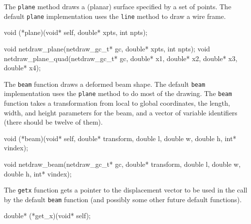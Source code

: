 The {\tt{}plane} method draws a (planar) surface specified by a set
of points.  The default {\tt{}plane} implementation uses the 
{\tt{}line} method to draw a wire frame.

\nwenddocs{}\plusendmoddef
void (*plane)(void* self, double* xpts, int npts);
\nwendcode{}\nwdocspar

\nwenddocs{}\plusendmoddef
void netdraw_plane(netdraw_gc_t* gc, double* xpts, int npts);
void netdraw_plane_quad(netdraw_gc_t* gc, 
                        double* x1, double* x2,
                        double* x3, double* x4);
\nwendcode{}\nwdocspar

The {\tt{}beam} function draws a deformed beam shape.  The default
{\tt{}beam} implementation uses the {\tt{}plane} method to do most
of the drawing. 
The {\tt{}beam} function takes a transformation from local to global coordinates,
the length, width, and height parameters for the beam, and a vector of
variable identifiers (there should be twelve of them).

\nwenddocs{}\plusendmoddef
void (*beam)(void* self, double* transform, 
             double l, double w, double h, 
             int* vindex);
\nwendcode{}\nwdocspar

\nwenddocs{}\plusendmoddef
void netdraw_beam(netdraw_gc_t* gc, double* transform,
                  double l, double w, double h, int* vindex);
\nwendcode{}\nwdocspar

The {\tt{}get{}x} function gets a pointer to the displacement vector to be
used in the call by the default {\tt{}beam} function (and possibly some
other future default functions).

\nwenddocs{}\plusendmoddef
double* (*get_x)(void* self);
\nwendcode{}\nwdocspar

